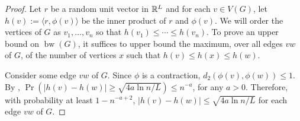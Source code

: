 \documentclass{patmorin}
\DeclareMathOperator{\bw}{bw}
\begin{document}

\begin{proof}
  Let $r$ be a random unit vector in $\mathbb{R}^L$ and for each $v\in V(G)$, let $h(v):=\langle r,\phi(v)\rangle$ be the inner product of $r$ and $\phi(v)$.  We will order the vertices of $G$ as $v_1,\ldots,v_n$ so that $h(v_1)\le \cdots \le h(v_n)$.  To prove an upper bound on $\bw(G)$, it suffices to upper bound the maximum, over all edges $vw$ of $G$, of the number of vertices $x$ such that $h(v)\le h(x)\le h(w)$.

  Consider some edge $vw$ of $G$. Since $\phi$ is a contraction, $d_2(\phi(v),\phi(w))\le 1$.  By \cite[Proposition~7]{feige:approximating}, $\Pr(|h(v)-h(w)|\ge \sqrt{4a\ln n/L}) \le n^{-a}$, for any $a>0$. Therefore, with probability at least $1-n^{-a+2}$, $|h(v)-h(w)|\le \sqrt{4a\ln n/L}$ for each edge $vw$ of $G$.


\end{proof}
\end{document}
